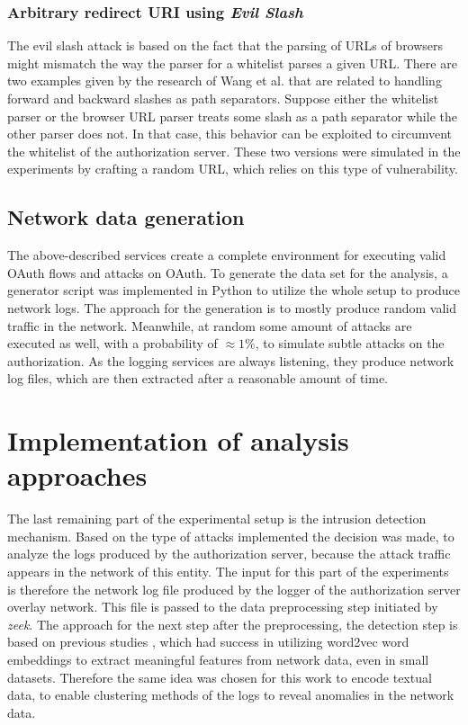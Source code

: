 \subsubsection{Arbitrary redirect URI using \emph{Evil Slash}}
The evil slash attack is based on the fact that the parsing of URLs of browsers might mismatch the way the parser for a whitelist parses a given URL. There are two examples given by the research of Wang et al. that are related to handling forward and backward slashes as path separators. Suppose either the whitelist parser or the browser URL parser treats some slash as a path separator while the other parser does not. In that case, this behavior can be exploited to circumvent the whitelist of the authorization server. These two versions were simulated in the experiments by crafting a random URL, which relies on this type of vulnerability.

\subsection{Network data generation}
The above-described services create a complete environment for executing valid OAuth flows and attacks on OAuth. To generate the data set for the analysis, a generator script was implemented in Python to utilize the whole setup to produce network logs. The approach for the generation is to mostly produce random valid traffic in the network. Meanwhile, at random some amount of attacks are executed as well, with a probability of $\approx 1\%$, to simulate subtle attacks on the authorization. As the logging services are always listening, they produce network log files, which are then extracted after a reasonable amount of time.

\section{Implementation of analysis approaches}
\label{sec:impl_analysis}
The last remaining part of the experimental setup is the intrusion detection mechanism. Based on the type of attacks implemented the decision was made, to analyze the logs produced by the authorization server, because the attack traffic appears in the network of this entity. The input for this part of the experiments is therefore the network log file produced by the logger of the authorization server overlay network. This file is passed to the data preprocessing step initiated by \emph{zeek}. The approach for the next step after the preprocessing, the detection step is based on previous studies \cite{corizzo2020feature}, which had success in utilizing word2vec word embeddings to extract meaningful features from network data, even in small datasets. Therefore the same idea was chosen for this work to encode textual data, to enable clustering methods of the logs to reveal anomalies in the network data.


